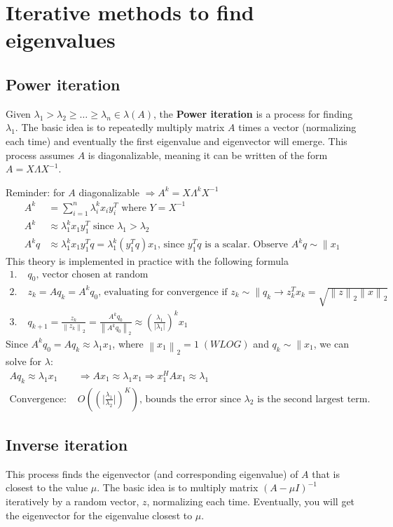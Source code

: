 \documentclass{article}
\newcommand{\norm}[2]{\left\lVert#1\right\rVert_#2}
\newcommand{\abs}[1]{\lvert#1\rvert}
\begin{document}
\section{Iterative methods to find eigenvalues}
\subsection{Power iteration}
Given $\lambda_1 > \lambda_2 \geq \dots \geq \lambda_n \in \lambda(A)$, the \textbf{Power iteration} is a process for finding $\lambda_1$. The basic idea is to repeatedly multiply matrix $A$ times a vector (normalizing each time) and eventually the first eigenvalue and eigenvector will emerge. This process assumes $A$ is diagonalizable, meaning it can be written of the form $A = X\Lambda X^{-1}$.

Reminder: for $A$ diagonalizable $\Longrightarrow A^k = X \Lambda^k X^{-1}$
\begin{align*}
    A^k &= \sum_{i = 1}^n \lambda_i^k x_i y_i^T \textrm{ where $Y = X^{-1}$}\\
    A^k &\approx \lambda_1^kx_1y_1^T \textrm{ since } \lambda_1 > \lambda_2\\
    A^kq &\approx \lambda_1^kx_1y_1^Tq = \lambda_1^k(y_1^Tq)x_1 \textrm{, since $y_1^Tq$ is a scalar. Observe } A^kq \sim \parallel x_1
\end{align*}
This theory is implemented in practice with the following formula
\begin{align*}
    1. \;& q_0 \textrm{, vector chosen at random}\\
    2. \;& z_k = Aq_k = A^kq_0 \textrm{, evaluating for convergence if } z_k \sim \parallel q_k \rightarrow z_k^Tx_k = \sqrt{\norm{z}{2}\norm{x}{2}}\\
    3. \;& q_{k+1} = \frac{z_k}{\norm{z_k}{2}} = \frac{A^kq_0}{\norm{A^kq_0}{2}} \approx (\frac{\lambda_1}{\abs{\lambda_1}})^kx_1
\end{align*}
Since $A^{k}q_0 = Aq_{k} \approx \lambda_1 x_1$, where $\norm{x_1}{2} = 1 \; (WLOG)$ and $q_k \sim \parallel x_1$, we can solve for $\lambda$:
\begin{align*}
    Aq_k \approx \lambda_1 x_1 &\Longrightarrow Ax_1 \approx \lambda_1x_1 \Rightarrow x_1^HAx_1 \approx \lambda_1\\
    \textrm{Convergence: } &O((\abs{\frac{\lambda_1}{\lambda_2}})^K) \textrm{, bounds the error since $\lambda_2$ is the second largest term.}
\end{align*}


\subsection{Inverse iteration}
This process finds the eigenvector (and corresponding eigenvalue) of $A$ that is closest to the value $\mu$. The basic idea is to multiply matrix $(A - \mu I)^{-1}$ iteratively by a random vector, $z$, normalizing each time. Eventually, you will get the eigenvector for the eigenvalue closest to $\mu$.
\end{document}
